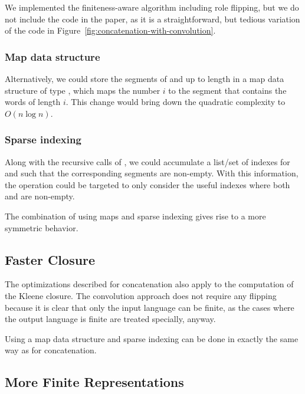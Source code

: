 We implemented the finiteness-aware algorithm including role flipping,
but we do not include the code in the paper, as it is a
straightforward, but tedious variation of the code in
Figure~\ref{fig:concatenation-with-convolution}. 

\subsubsection{Map data structure}
Alternatively, we could store the segments of  and 
up to length  in a map data structure of type
, which maps the number $i$ to the
segment that contains the words of length $i$. This change would bring
down the quadratic complexity to $O (n\log n)$. 

\subsubsection{Sparse indexing}
Along with the recursive calls of , we could accumulate
a list/set of indexes for  and  such that the
corresponding segments are non-empty. With this information, the
 operation could be targeted to only consider the useful
indexes where both  and  are
non-empty.

The combination of using maps and sparse indexing gives rise to a
more symmetric behavior.

\subsection{Faster Closure}
\label{sec:faster-closure}

The optimizations described for concatenation also apply to the
computation of the Kleene closure. The convolution approach does not
require any flipping because it is clear that only the input language
can be finite, as the cases where the output language is finite are
treated specially, anyway.  

Using a map data structure and sparse indexing can be done in exactly
the same way as for concatenation.

\subsection{More Finite Representations}
\label{sec:more-finite-repr}

